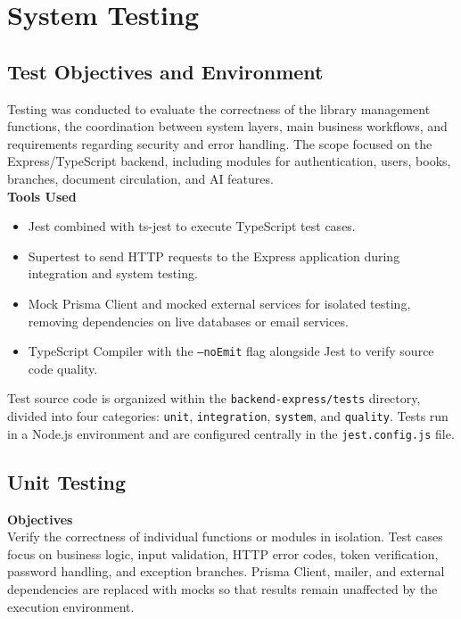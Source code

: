 \section{System Testing}

\subsection{Test Objectives and Environment}

Testing was conducted to evaluate the correctness of the library management functions, the coordination between system layers, main business workflows, and requirements regarding security and error handling. The scope focused on the Express/TypeScript backend, including modules for authentication, users, books, branches, document circulation, and AI features.\\

\textbf{Tools Used}
\begin{itemize}
        \item Jest combined with ts-jest to execute TypeScript test cases.
        \item Supertest to send HTTP requests to the Express application during integration and system testing.
        \item Mock Prisma Client and mocked external services for isolated testing, removing dependencies on live databases or email services.
        \item TypeScript Compiler with the \texttt{--noEmit} flag alongside Jest to verify source code quality.
\end{itemize}

\noindent Test source code is organized within the \texttt{backend-express/tests} directory, divided into four categories: \texttt{unit}, \texttt{integration}, \texttt{system}, and \texttt{quality}. Tests run in a Node.js environment and are configured centrally in the \texttt{jest.config.js} file.

\subsection{Unit Testing}

\textbf{Objectives} \\

Verify the correctness of individual functions or modules in isolation. Test cases focus on business logic, input validation, HTTP error codes, token verification, password handling, and exception branches. Prisma Client, mailer, and external dependencies are replaced with mocks so that results remain unaffected by the execution environment.\\

